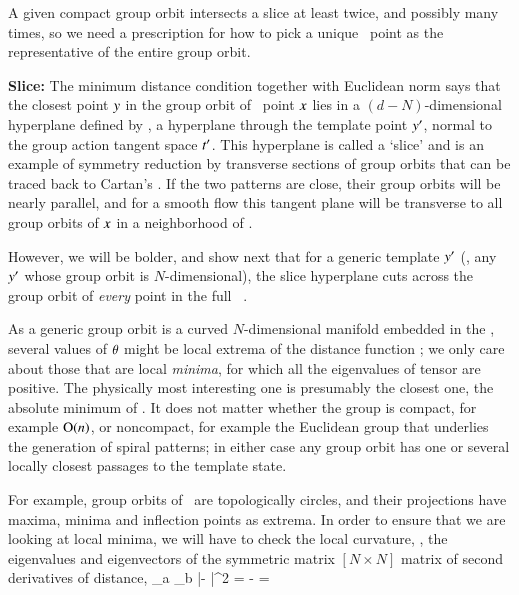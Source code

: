 A given compact group orbit intersects a slice at least twice, and
possibly many times, so we need a prescription for how to
pick a unique \reducedsp\ point as the representative of the entire group
orbit.

{\bf Slice:}
The minimum distance condition  together with
Euclidean norm says that the
closest point $y$ in the group orbit of \statesp\ point $x$ lies in a
$(d\!-\!N)$-dimensional hyperplane defined by ,
a hyperplane through the template point ${y'}$,
normal to the group action tangent
space $t'_{}$.
This hyperplane is called a `slice' and is an example of
symmetry reduction by transverse sections of
group orbits that
can be traced back to Cartan's \mframes{}.
If the two patterns are
close, their group orbits will be nearly parallel, and for a smooth flow
this tangent plane will be transverse to all group orbits of $x$ in a
neighborhood of \slicep.

However, we will be bolder, and show next that for a generic template
${y'}$ (\ie, any ${y'}$ whose group orbit is $N$-dimensional), the
slice hyperplane  cuts across the group orbit of {\em
every} point in the full \statesp\ \pS.


As a generic group orbit is a curved $N$-dimensional manifold embedded in
the \statesp, several values of ${\bf \theta}$ might be local extrema of the
distance function ; we only care about those that are
local {\em minima}, for which all the eigenvalues of tensor
 are positive. The physically most interesting one is
presumably the closest one, the absolute minimum of .
It does not matter whether the group is compact, for example $\textrm{O}(n)$, or
noncompact, for example the Euclidean group that underlies the generation
of spiral patterns; in either case any group orbit has
one or several locally closest passages to the template state.

For
example, group orbits of \ are topologically circles, and their
projections have maxima, minima and inflection points as extrema.
In order to ensure that we are looking at local minima, we will have to
check the local curvature, \ie, the eigenvalues and eigenvectors of the
symmetric matrix $[N\!\times\!N]$ matrix of second derivatives
of distance,
\beq
{}
     {\partial \gSpace_a \partial \gSpace_b}
        |\sspRed - \slicep|^2
    =
  - =


